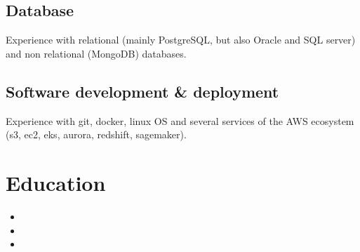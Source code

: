 \documentclass[11pt,a4paper,sans]{moderncv}        %
\begin{document}
\subsection{Database}
Experience with relational (mainly PostgreSQL, but also Oracle and SQL server) and non relational (MongoDB) databases.
\subsection{Software development \& deployment}
Experience with git, docker, linux OS and several services of the AWS ecosystem (s3, ec2, eks, aurora, redshift, sagemaker).

\section{Education}
\begin{itemize}
\item{}
\item{}
\item{}
\end{itemize}
\end{document}
